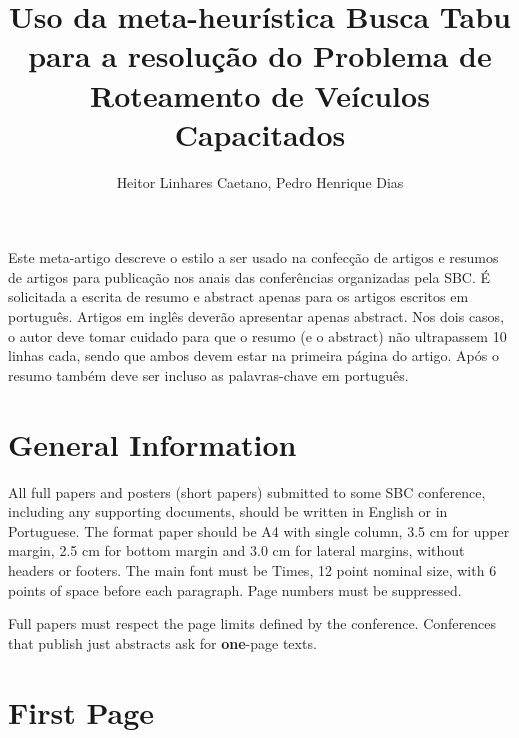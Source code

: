 \documentclass[12pt]{article}
\title{Uso da meta-heurística Busca Tabu para a resolução do Problema de Roteamento de
  Veículos Capacitados}
\author{Heitor Linhares Caetano, Pedro Henrique Dias}
\begin{document}
 

\maketitle

     
\begin{resumo} 
  Este meta-artigo descreve o estilo a ser usado na confecção de artigos e
  resumos de artigos para publicação nos anais das conferências organizadas
  pela SBC. É solicitada a escrita de resumo e abstract apenas para os artigos
  escritos em português. Artigos em inglês deverão apresentar apenas abstract.
  Nos dois casos, o autor deve tomar cuidado para que o resumo (e o abstract)
  não ultrapassem 10 linhas cada, sendo que ambos devem estar na primeira
  página do artigo. Após o resumo também deve ser incluso as palavras-chave
  em português.
\end{resumo}


\section{General Information}

All full papers and posters (short papers) submitted to some SBC conference,
including any supporting documents, should be written in English or in
Portuguese. The format paper should be A4 with single column, 3.5 cm for upper
margin, 2.5 cm for bottom margin and 3.0 cm for lateral margins, without
headers or footers. The main font must be Times, 12 point nominal size, with 6
points of space before each paragraph. Page numbers must be suppressed.

Full papers must respect the page limits defined by the conference.
Conferences that publish just abstracts ask for \textbf{one}-page texts.

\section{First Page} \label{sec:firstpage}
\end{document}
